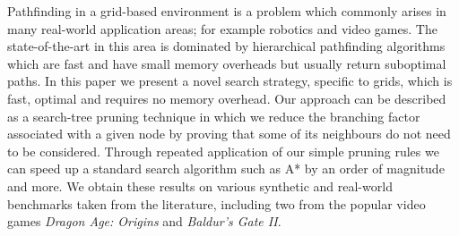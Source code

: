 Pathfinding in a grid-based environment is a problem which commonly arises in
many real-world application areas; for example robotics and video games.  The
state-of-the-art in this area is dominated by hierarchical pathfinding
algorithms which are fast and have small memory overheads but usually return
suboptimal paths.  
In this paper we present a novel search strategy, specific to
grids, which is fast, optimal and requires no memory overhead.  Our approach can
be described as a search-tree pruning technique in which we reduce the branching
factor associated with a given node by proving that some of its neighbours do
not need to be considered.  Through repeated application of our simple pruning
rules we can speed up a standard search algorithm such as A* by an order of
magnitude and more.  We obtain these results on various synthetic and real-world
benchmarks taken from the literature, including two from the popular video games
\emph{Dragon Age: Origins} and \emph{Baldur's Gate II}.


